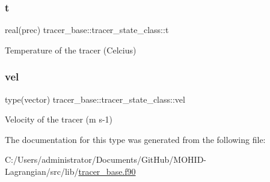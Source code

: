 \subsubsection{\texorpdfstring{t}{t}}
{\footnotesize\ttfamily real(prec) tracer\+\_\+base\+::tracer\+\_\+state\+\_\+class\+::t\hspace{0.3cm}{\ttfamily [private]}}



Temperature of the tracer (Celcius) 

\mbox{\label{structtracer__base_1_1tracer__state__class_a46296517bb40271bcff0fe9c85024e7c}} 
\subsubsection{\texorpdfstring{vel}{vel}}
{\footnotesize\ttfamily type(vector) tracer\+\_\+base\+::tracer\+\_\+state\+\_\+class\+::vel\hspace{0.3cm}{\ttfamily [private]}}



Velocity of the tracer (m s-\/1) 



The documentation for this type was generated from the following file\+:\begin{DoxyCompactItemize}
\item 
C\+:/\+Users/administrator/\+Documents/\+Git\+Hub/\+M\+O\+H\+I\+D-\/\+Lagrangian/src/lib/\mbox{\hyperlink{tracer__base_8f90}{tracer\+\_\+base.\+f90}}\end{DoxyCompactItemize}

